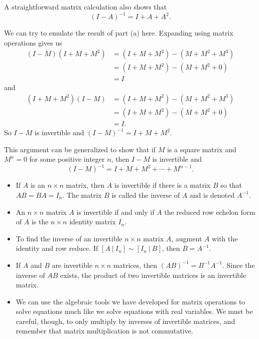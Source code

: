 \begin{example}
\begin{enumerate}[i.]
A straightforward matrix calculation also shows that 
\[(I-A)^{-1} = I+A+A^2.\]
	
	\end{enumerate}

\item We can try to emulate the result of part (a) here. Expanding using matrix operations gives us
\begin{align*}
(I-M)(I+M+M^2) &= (I+M+M^2) - (M+M^2+M^3) \\
	&= (I+M+M^2) - (M+M^2+0) \\
	&= I
\end{align*}
and
\begin{align*}
(I+M+M^2)(I-M) &= (I+M+M^2) - (M+M^2+M^3) \\
	&= (I+M+M^2) - (M+M^2+0) \\
	&= I.
\end{align*}	 
So $I-M$ is invertible and $(I-M)^{-1} = I+M+M^2$. 

This argument can be generalized to show that if $M$ is a square matrix and $M^n = 0$ for some positive integer $n$, then $I-M$ is invertible and 
\[(I-M)^{-1} = I+M+M^2+ \cdots + M^{n-1}.\] 

\ea


\end{example}

\begin{itemize}
\item If $A$ is an $n \times n$ matrix, then $A$ is invertible if there is a matrix $B$ so that $AB = BA = I_n$. The matrix $B$ is called the inverse of $A$ and is denoted $A^{-1}$.
\item An $n \times n$ matrix $A$ is invertible if and only if $A$ the reduced row echelon form of $A$ is the $n \times n$ identity matrix $I_n$. 
\item To find the inverse of an invertible $n \times n$ matrix $A$, augment $A$ with the identity and row reduce. If $[A \ | \ I_n] \sim [I_n \ | \ B]$, then $B = A^{-1}$.
\item If $A$ and $B$ are invertible $n \times n$ matrices, then $(AB)^{-1}=B^{-1}A^{-1}$. Since the inverse of $AB$ exists, the product of two invertible matrices is an invertible matrix. 
\item We can use the algebraic tools we have developed for matrix operations to solve equations much like we solve equations with real variables. We must be careful, though, to only multiply by inverses of invertible matrices, and remember that matrix multiplication is not commutative. 
\end{itemize}




